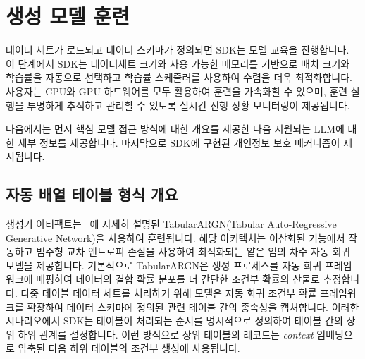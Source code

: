 
\section{생성 모델 훈련}

데이터 세트가 로드되고 데이터 스키마가 정의되면 SDK는 모델 교육을 진행합니다.
이 단계에서 SDK는 데이터세트 크기와 사용 가능한 메모리를 기반으로 배치 크기와 학습률을 자동으로 선택하고 학습률 스케줄러를 사용하여 수렴을 더욱 최적화합니다.
사용자는 CPU와 GPU 하드웨어를 모두 활용하여 훈련을 가속화할 수 있으며, 훈련 실행을 투명하게 추적하고 관리할 수 있도록 실시간 진행 상황 모니터링이 제공됩니다.

다음에서는 먼저 핵심 모델 접근 방식에 대한 개요를 제공한 다음 지원되는 LLM에 대한 세부 정보를 제공합니다. 마지막으로 SDK에 구현된 개인정보 보호 메커니즘이 제시됩니다.

\subsection{자동 배열 테이블 형식 개요}

생성기 아티팩트는 ~\cite{tabularargn}에 자세히 설명된 TabularARGN(Tabular Auto-Regressive Generative Network)을 사용하여 훈련됩니다.
해당 아키텍처는 이산화된 기능에서 작동하고 범주형 교차 엔트로피 손실을 사용하여 최적화되는 얕은 임의 차수 자동 회귀 모델을 제공합니다.
기본적으로 TabularARGN은 생성 프로세스를 자동 회귀 프레임워크에 매핑하여 데이터의 결합 확률 분포를 더 간단한 조건부 확률의 산물로 추정합니다.
다중 테이블 데이터 세트를 처리하기 위해 모델은 자동 회귀 조건부 확률 프레임워크를 확장하여 데이터 스키마에 정의된 관련 테이블 간의 종속성을 캡처합니다.
이러한 시나리오에서 SDK는 테이블이 처리되는 순서를 명시적으로 정의하여 테이블 간의 상위-하위 관계를 설정합니다.
이런 방식으로 상위 테이블의 레코드는 \emph{context} 임베딩으로 압축된 다음 하위 테이블의 조건부 생성에 사용됩니다.

